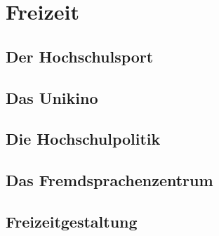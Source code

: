 \documentclass[12pt, a4paper]{article}
\newif\ifinfo
\begin{document}
\section{Freizeit}

\subsection{Der Hochschulsport}


\subsection{Das Unikino}


\subsection{Die Hochschulpolitik}



\subsection{Das Fremdsprachenzentrum}


\newpage
\subsection{Freizeitgestaltung}




%

%

\ifinfo
\newpage
\subsection{Sehenswürdigkeiten}

\fi
\end{document}
